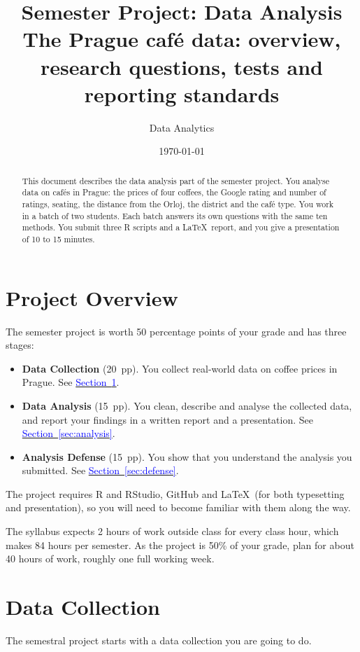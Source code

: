 \documentclass[11pt,a4paper]{article}
\title{\textbf{Semester Project: Data Analysis}\\[0.4ex]\large The Prague caf\'e data: overview, research questions, tests and reporting standards}
\author{Data Analytics}
\date{\today}
\begin{document}
\maketitle

\begin{abstract}
\noindent This document describes the data analysis part of the semester project. You analyse data on caf\'es in Prague: the prices of four coffees, the Google rating and number of ratings, seating, the distance from the Orloj, the district and the caf\'e type. You work in a batch of two students. Each batch answers its own questions with the same ten methods. You submit three R scripts and a \LaTeX\ report, and you give a presentation of 10 to 15 minutes.
\end{abstract}

\clearpage
\tableofcontents

\clearpage

\section*{Project Overview}
The semester project is worth 50 percentage points of your grade and has three stages:

\begin{itemize}
	\item \textbf{Data Collection} (20~pp). You collect real-world data on coffee prices in Prague. See \hyperref[sec:collection]{\textcolor{blue}{Section~\ref*{sec:collection}}}.
	\item \textbf{Data Analysis} (15~pp). You clean, describe and analyse the collected data, and report your findings in a written report and a presentation. See \hyperref[sec:analysis]{\textcolor{blue}{Section~\ref*{sec:analysis}}}.
	\item \textbf{Analysis Defense} (15~pp). You show that you understand the analysis you submitted. See \hyperref[sec:defense]{\textcolor{blue}{Section~\ref*{sec:defense}}}.
\end{itemize}

The project requires R and RStudio, GitHub and \LaTeX\ (for both typesetting and presentation), so you will need to become familiar with them along the way.

The syllabus expects 2 hours of work outside class for every class hour, which makes 84 hours per semester. As the project is 50\% of your grade, plan for about 40 hours of work, roughly one full working week.

\clearpage
\section{Data Collection}\label{sec:collection}
The semestral project starts with a data collection you are going to do. 
\end{document}
